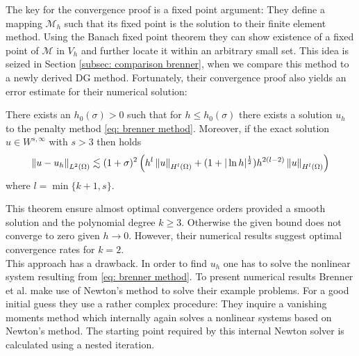 The key for the convergence proof is a fixed point argument: %
They define a mapping $\mathcal M_h$ such that its fixed point is the solution to their finite element method. 
Using the Banach fixed point theorem they can show existence of a fixed point of $\mathcal M$ in $V_h$ and further locate it within an arbitrary small set. This idea is seized in Section \ref{subsec: comparison brenner}, when we compare this method to a newly derived DG method. Fortunately, their convergence proof also yields an error estimate for their numerical solution:
\begin{theorem}\label{thm: error estimate brenner}
	There exists an $h_0(\sigma) > 0$ such that for $h \leq h_0(\sigma)$ there exists a solution $u_h$ to the penalty method \eqref{eq: brenner method}. Moreover, if the exact solution $u \in W^{s,\infty}$ with $s>3$ then holds
	\begin{align*}
		\left\lVert u-u_h \right\rVert_{L^2(\Omega)} \lesssim (1+\sigma)^2 
		                        \left(h^{l} \left\lVert u \right\rVert_{H^l(\Omega)} + (1+ | \ln h |^{\frac 1 2 }) h^{2(l-2)} \left\lVert u \right\rVert_{H^l(\Omega)} \right)
	\end{align*}
where $l=\min\{k+1,s\}$. 
\end{theorem}
This theorem ensure almost optimal convergence orders provided a smooth solution and the polynomial degree $k\geq 3$. Otherwise the given bound does not converge to zero given $h \rightarrow 0$. However, their numerical results suggest optimal convergence rates for $k=2$.\\
This approach has a drawback. In order to find $u_h$ one has to solve the nonlinear system resulting from \eqref{eq: brenner method}. To present numerical results Brenner et al. make use of Newton's method to solve their example problems. 
For a good initial guess they use a rather complex procedure: They inquire a vanishing moments method which internally again solves a nonlinear systems based on Newton's method. The starting point required by this internal Newton solver is calculated using a nested iteration.

